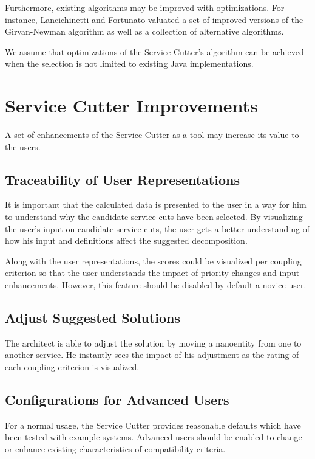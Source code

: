 Furthermore, existing algorithms may be improved with optimizations. For instance, Lancichinetti and Fortunato\cite{lancichinetti2009community} valuated a set of improved versions of the Girvan-Newman algorithm as well as a collection of alternative algorithms.

We assume that optimizations of the Service Cutter's algorithm can be achieved when the selection is not limited to existing Java implementations.

\section{Service Cutter Improvements}

A set of enhancements of the Service Cutter as a tool may increase its value to the users.

\subsection{Traceability of User Representations}

It is important that the calculated data is presented to the user in a way for him to understand why the candidate service cuts have been selected. By visualizing the user's input on candidate service cuts, the user gets a better understanding of how his input and definitions affect the suggested decomposition. 

Along with the user representations, the scores could be visualized per coupling criterion so that the user understands the impact of priority changes and input enhancements. However, this feature should be disabled by default a novice user. 

\subsection{Adjust Suggested Solutions}

The architect is able to adjust the solution by moving a nanoentity from one to another service. He instantly sees the impact of his adjustment as the rating of each coupling criterion is visualized.

\subsection{Configurations for Advanced Users}

For a normal usage, the Service Cutter provides reasonable defaults which have been tested with example systems. Advanced users should be enabled to change or enhance existing characteristics of compatibility criteria.

